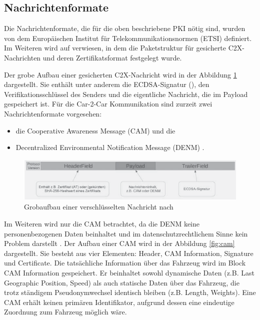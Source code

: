 \subsection{Nachrichtenformate}
\label{sec:FirstContentSection:SecondSubSection}

Die Nachrichtenformate, die für die oben beschriebene PKI nötig sind, wurden von dem Europäischen Institut für Telekommunikationsnormen (ETSI) definiert. Im Weiteren wird auf \cite{ETSI2018} verwiesen, in dem die Paketstruktur für gesicherte C2X-Nachrichten und deren Zertifikatsformat festgelegt wurde. 

Der grobe Aufbau einer gesicherten C2X-Nachricht wird in der Abbildung \ref{fig:nachrichtenaufbau} dargestellt. Sie enthält unter anderem die ECDSA-Signatur (\cite{Barker2013}), den Verifikationsschlüssel des Senders und die eigentliche Nachricht, die im Payload gespeichert ist. Für die Car-2-Car Kommunikation sind zurzeit zwei Nachrichtenformate vorgesehen:
\begin{itemize}
	\item die Cooperative Awareness Message (CAM) und die 
	\item Decentralized Environmental Notification Message (DENM) \cite{ETSI2013}.
\end{itemize}

\begin{figure}
	\centering
	\includegraphics[width=0.7\linewidth]{images/Nachrichtenaufbau}
	\caption{Grobaufbau einer verschlüsselten Nachricht nach \cite{Strubbe2017}}
	\label{fig:nachrichtenaufbau}
\end{figure}

Im Weiteren wird nur die CAM betrachtet, da die DENM keine personenbezogenen Daten beinhaltet und im datenschutzrechtlichem Sinne kein Problem darstellt \cite{Kiometzis2017}. Der Aufbau einer CAM wird in der Abbildung \ref{fig:cam} dargestellt. Sie besteht aus vier Elementen: Header, CAM Information, Signature und Certificate. Die tatsächliche Information über das Fahrzeug wird im Block CAM Information gespeichert. Er beinhaltet sowohl dynamische Daten (z.B. Last Geographic Position, Speed) als auch statische Daten über das Fahrzeug, die trotz ständigem Pseudonymwechsel identisch bleiben (z.B. Length, Weights). Eine CAM erhält keinen primären Identifikator, aufgrund dessen eine eindeutige Zuordnung zum Fahrzeug möglich wäre.

